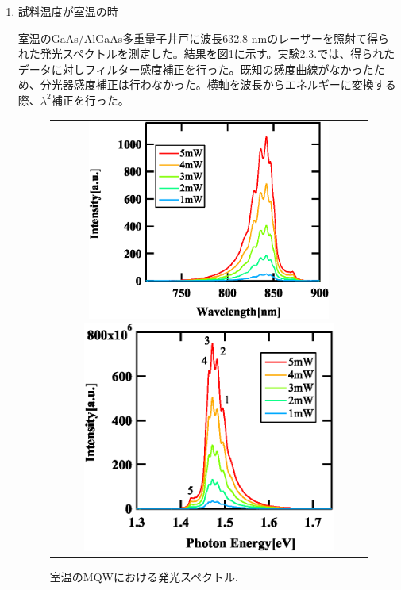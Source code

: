 \documentclass[11pt,a4j]{jsarticle}
\begin{document}
\begin{enumerate}%
 \item 試料温度が室温の時

       室温のGaAs/AlGaAs多重量子井戸に波長632.8 nmのレーザーを照射て得られた発光スペクトルを測定した。結果を図\ref{fig_mqw_rt_spec1}に示す。実験2.3.では、得られたデータに対しフィルター感度補正を行った。既知の感度曲線がなかったため、分光器感度補正は行わなかった。横軸を波長からエネルギーに変換する際、$\lambda^2$補正を行った。

       \begin{figure}[ht]
        \centering
        \begin{tabular}{c}

         \begin{minipage}{0.52\hsize}

          \includegraphics[clip,width=8cm]{start2_MQW_rt_Spectrum_wav.eps}
         \end{minipage}

           \begin{minipage}{0.06\hsize}%
             \hspace{5mm}
           \end{minipage}

         \begin{minipage}{0.5\hsize}
          \centering
          \includegraphics[clip,width=8.3cm]{start2_MQW_rt_Spectrum_eV.eps}
         \end{minipage}
        \end{tabular}
        \caption{室温のMQWにおける発光スペクトル.}
        \label{fig_mqw_rt_spec1}


\end{figure}
\end{enumerate}
\end{document}
